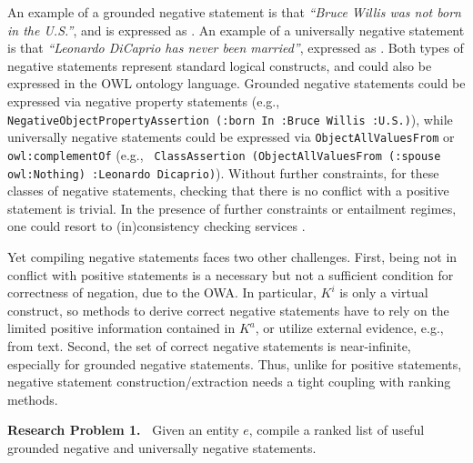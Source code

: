 An example of a grounded negative statement is that \textit{``Bruce Willis was not born in the U.S.''}, and is expressed as . An example of a universally negative statement is that \textit{``Leonardo DiCaprio has never been married''}, expressed as . Both types of negative statements represent standard logical constructs, and could also be expressed in the OWL ontology language. Grounded negative statements could be expressed via negative property statements (e.g., {\small{\texttt{NegativeObjectPropertyAssertion }}{\small\texttt{(:born In :Bruce Willis :U.S.)}}}), while universally negative statements could be expressed via \texttt{ObjectAllValuesFrom} or \texttt{owl:complementOf} \cite{erxleben2014introducing} (e.g., {\small{\texttt{ ClassAssertion (ObjectAl\-lValuesFrom (:spouse owl:Nothing) :Leonardo Dicaprio)}}}). Without further constraints, for these classes of negative statements, checking that there is no conflict with a positive statement is trivial. In the presence of further constraints or entailment regimes, one could resort to (in)cons\-istency checking services \cite{logichandbook,Pan2017,gadwww}.



Yet compiling negative statements faces two other challenges.
First, being not in conflict with positive statements is a necessary but not a sufficient condition for correctness of negation, due to the OWA. In particular, $K^i$ is only a virtual construct, so methods to derive correct negative statements have to rely on the limited positive information contained in $K^a$, or utilize external evidence, e.g., from text. Second, the set of correct negative statements is near-infinite, especially for grounded negative statements. Thus, unlike for positive statements, negative statement construction/extraction needs a tight coupling with ranking methods.

\noindent
\textbf{Research Problem 1.\ }
Given an entity $e$, compile a ranked list of useful grounded negative and universally negative statements.




